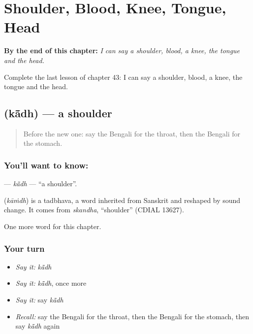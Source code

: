 
\chapter{Shoulder, Blood, Knee, Tongue, Head}
\label{ch:bn-shoulder-blood-knee-tongue-head}

\begin{chapteropening}
\textbf{By the end of this chapter:} \emph{I can say a shoulder, blood, a knee, the tongue and the head.}

Complete the last lesson of chapter 43: I can say a shoulder, blood, a knee, the tongue and the head.
\end{chapteropening}

\section[\texorpdfstring{\bn{কাঁধ} (kā̃dh)}{কাঁধ (kā̃dh)}]{ (kā̃dh) — a shoulder}

\label{lesson:BN-C43-kadh}



\begin{quote}
Before the new one: say the Bengali for the throat, then the Bengali for the stomach.
\end{quote}

\subsection*{You'll want to know: }
\textbf{} — \emph{kā̃dh} — \textquotedblleft{}a shoulder\textquotedblright{}.

\begin{cousinweb}
\textbf{} (\emph{kāṁdh}) is a tadbhava, a word inherited from Sanskrit and reshaped by sound change. It comes from \emph{skandha}, \textquotedblleft{}shoulder\textquotedblright{} (CDIAL 13627).
\end{cousinweb}

\begin{grammarlens}[title={What you've built}]
One more word for this chapter.
\end{grammarlens}

\subsection*{Your turn}
\begin{itemize}
\raggedright
  \item \emph{Say it:} \emph{kā̃dh}
  \item \emph{Say it:} \emph{kā̃dh}, once more
  \item \emph{Say it:} say \emph{kā̃dh}
  \item \emph{Recall:} say the Bengali for the throat, then the Bengali for the stomach, then say \emph{kā̃dh} again
\end{itemize}

